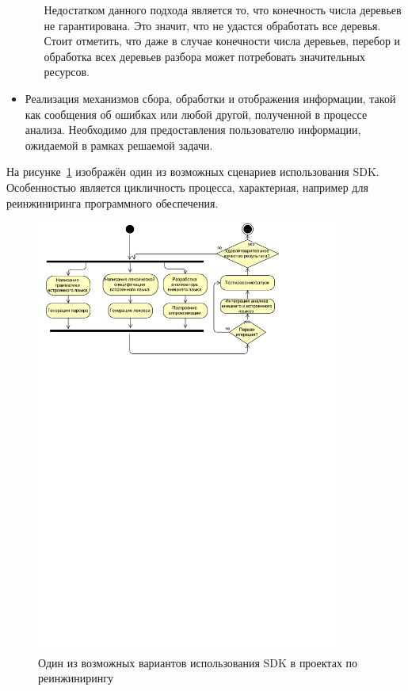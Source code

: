 \begin{itemize}
\begin{itemize}
Недостатком данного подхода является то, что конечность числа деревьев не гарантирована. Это значит, что не удастся обработать все деревья. Стоит отметить, что даже в случае конечности числа деревьев, перебор и обработка всех деревьев разбора может потребовать значительных ресурсов.
    \end{itemize}
    \item Реализация механизмов сбора, обработки и отображения информации, такой как сообщения об ошибках или любой другой, полученной в процессе анализа. Необходимо для предоставления пользователю информации, ожидаемой в рамках решаемой задачи.
\end{itemize}

На рисунке~\ref{fig:activMethod} изображён один из возможных сценариев использования SDK. Особенностью является цикличность процесса, характерная, например для реинжиниринга программного обеспечения.

\begin{figure}[h!]
\begin{center}
\includegraphics[width=0.9\textwidth]{pics/ActivMethodology}
\caption{Один из возможных вариантов использования SDK в проектах по реинжинирингу}
\label{fig:activMethod} 
\end{center}
\end{figure}

